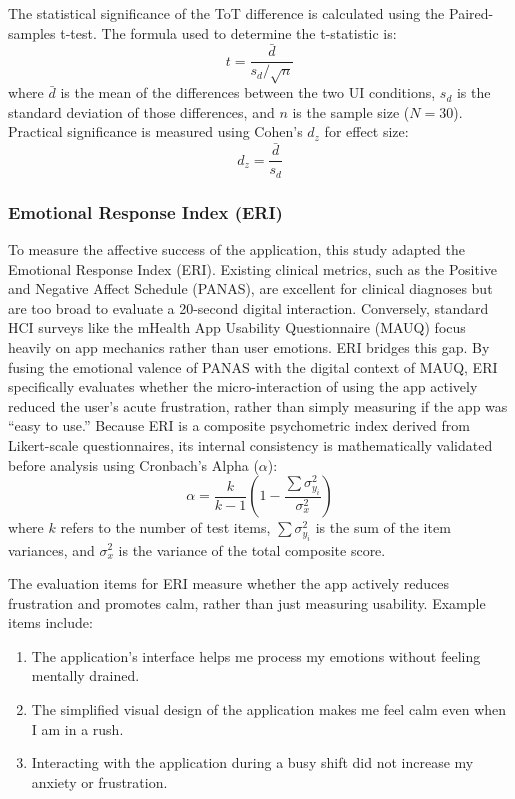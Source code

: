 The statistical significance of the ToT difference is calculated using the Paired-samples t-test. The formula used to determine the t-statistic is:
\[t = \frac{\bar{d}}{s_d / \sqrt{n}}\]
where $\bar{d}$ is the mean of the differences between the two UI conditions, $s_d$ is the standard deviation of those differences, and $n$ is the sample size ($N=30$). Practical significance is measured using Cohen's $d_z$ for effect size:
\[d_z = \frac{\bar{d}}{s_d}\]

\subsubsection{Emotional Response Index (ERI)}

To measure the affective success of the application, this study adapted the Emotional Response Index (ERI). Existing clinical metrics, such as the Positive and Negative Affect Schedule (PANAS), are excellent for clinical diagnoses but are too broad to evaluate a 20-second digital interaction. Conversely, standard HCI surveys like the mHealth App Usability Questionnaire (MAUQ) focus heavily on app mechanics rather than user emotions. ERI bridges this gap. By fusing the emotional valence of PANAS with the digital context of MAUQ, ERI specifically evaluates whether the micro-interaction of using the app actively reduced the user's acute frustration, rather than simply measuring if the app was ``easy to use.'' Because ERI is a composite psychometric index derived from Likert-scale questionnaires, its internal consistency is mathematically validated before analysis using Cronbach's Alpha ($\alpha$):
\[\alpha = \frac{k}{k-1} \left( 1 - \frac{\sum \sigma_{y_i}^2}{\sigma_x^2} \right)\]
where $k$ refers to the number of test items, $\sum \sigma_{y_i}^2$ is the sum of the item variances, and $\sigma_x^2$ is the variance of the total composite score.

The evaluation items for ERI measure whether the app actively reduces frustration and promotes calm, rather than just measuring usability. Example items include:

\begin{enumerate}
	\item The application's interface helps me process my emotions without feeling mentally drained.
	\item The simplified visual design of the application makes me feel calm even when I am in a rush.
	\item Interacting with the application during a busy shift did not increase my anxiety or frustration.
\end{enumerate}

